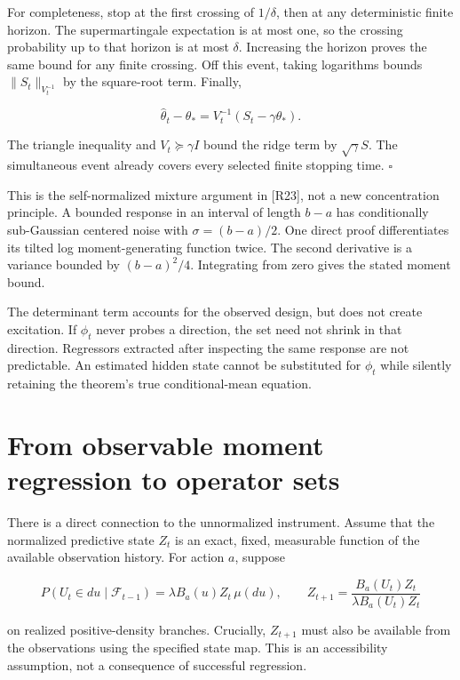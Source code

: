 For completeness, stop at the first crossing of \(1/\delta\), then at
any deterministic finite horizon. The supermartingale expectation is at
most one, so the crossing probability up to that horizon is at most
\(\delta\). Increasing the horizon proves the same bound for any finite
crossing. Off this event, taking logarithms bounds
\(\|S_t\|_{V_t^{-1}}\) by the square-root term. Finally,

\[
\widehat\theta_t-\theta_*
=V_t^{-1}(S_t-\gamma\theta_*).
\]

The triangle inequality and \(V_t\succeq\gamma I\) bound the ridge term
by \(\sqrt\gamma S\). The simultaneous event already covers every
selected finite stopping time. \(\square\)

This is the self-normalized mixture argument in {[}R23{]}, not a new
concentration principle. A bounded response in an interval of length
\(b-a\) has conditionally sub-Gaussian centered noise with
\(\sigma=(b-a)/2\). One direct proof differentiates its tilted log
moment-generating function twice. The second derivative is a variance
bounded by \((b-a)^2/4\). Integrating from zero gives the stated moment
bound.

The determinant term accounts for the observed design, but does not
create excitation. If \(\phi_t\) never probes a direction, the set need
not shrink in that direction. Regressors extracted after inspecting the
same response are not predictable. An estimated hidden state cannot be
substituted for \(\phi_t\) while silently retaining the theorem's true
conditional-mean equation.

\section{From observable moment regression to operator sets}\label{LSM:from-observable-moment-regression-to-operator-sets}

There is a direct connection to the unnormalized instrument. Assume that
the normalized predictive state \(Z_t\) is an exact, fixed, measurable
function of the available observation history. For action \(a\), suppose

\[
P(U_t\in du\mid\mathcal F_{t-1})
=\lambda B_a(u)Z_t\,\mu(du),
\qquad
Z_{t+1}=\frac{B_a(U_t)Z_t}{\lambda B_a(U_t)Z_t}
\]

on realized positive-density branches. Crucially, \(Z_{t+1}\) must also
be available from the observations using the specified state map. This
is an accessibility assumption, not a consequence of successful
regression.

